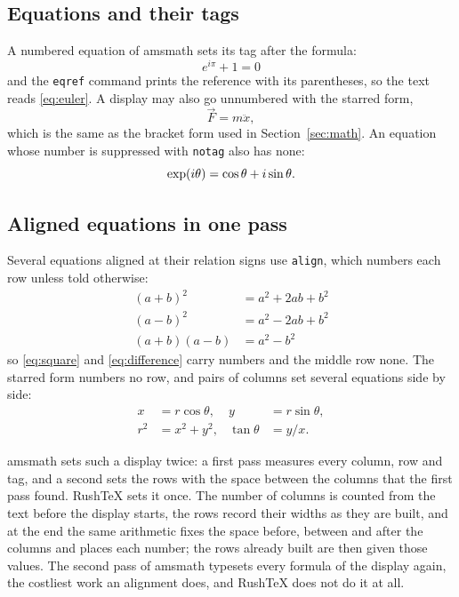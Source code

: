 \documentclass{article}
\numberwithin{equation}{section}
\theoremstyle{definition}
\theoremstyle{remark}
\begin{document}
\subsection{Equations and their tags}

A numbered equation of amsmath sets its tag after the formula:
\begin{equation}\label{eq:euler}
  e^{i\pi} + 1 = 0
\end{equation}
and the \texttt{eqref} command prints the reference with its parentheses, so the text
reads \eqref{eq:euler}. A display may also go unnumbered with the starred form,
\begin{equation*}
  \vec{F} = m \ddot{x} ,
\end{equation*}
which is the same as the bracket form used in Section~\ref{sec:math}. An equation whose
number is suppressed with \texttt{notag} also has none:
\begin{equation}
  \exp(i\theta) = \cos\theta + i \sin\theta . \notag
\end{equation}

\subsection{Aligned equations in one pass}

Several equations aligned at their relation signs use \texttt{align}, which numbers each
row unless told otherwise:
\begin{align}
  (a+b)^{2} &= a^{2} + 2ab + b^{2} \label{eq:square} \\
  (a-b)^{2} &= a^{2} - 2ab + b^{2} \nonumber \\
  (a+b)(a-b) &= a^{2} - b^{2} \label{eq:difference}
\end{align}
so \eqref{eq:square} and \eqref{eq:difference} carry numbers and the middle row none.
The starred form numbers no row, and pairs of columns set several equations side by
side:
\begin{align*}
  x &= r\cos\theta, & y &= r\sin\theta, \\
  r^{2} &= x^{2} + y^{2}, & \tan\theta &= y/x .
\end{align*}

amsmath sets such a display twice: a first pass measures every column, row and tag, and
a second sets the rows with the space between the columns that the first pass found.
RushTeX sets it once. The number of columns is counted from the text before the display
starts, the rows record their widths as they are built, and at the end the same
arithmetic fixes the space before, between and after the columns and places each
number; the rows already built are then given those values. The second pass of amsmath
typesets every formula of the display again, the costliest work an alignment does, and
RushTeX does not do it at all.
\end{document}
